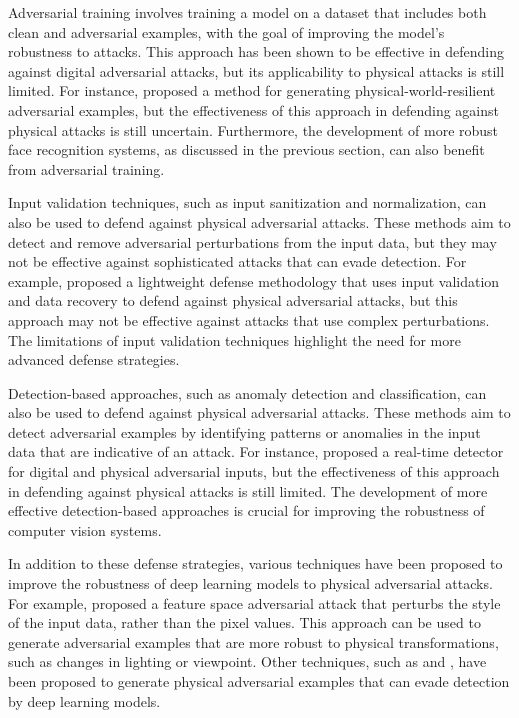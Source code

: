 \documentclass[11pt,a4paper]{article}
\begin{document}
Adversarial training involves training a model on a dataset that includes both clean and adversarial examples, with the goal of improving the model's robustness to attacks. This approach has been shown to be effective in defending against digital adversarial attacks, but its applicability to physical attacks is still limited. For instance, \cite{doi:10.1109/cvpr42600.2020.01426} proposed a method for generating physical-world-resilient adversarial examples, but the effectiveness of this approach in defending against physical attacks is still uncertain. Furthermore, the development of more robust face recognition systems, as discussed in the previous section, can also benefit from adversarial training.

Input validation techniques, such as input sanitization and normalization, can also be used to defend against physical adversarial attacks. These methods aim to detect and remove adversarial perturbations from the input data, but they may not be effective against sophisticated attacks that can evade detection. For example, \cite{doi:10.1109/asp-dac47756.2020.9045584} proposed a lightweight defense methodology that uses input validation and data recovery to defend against physical adversarial attacks, but this approach may not be effective against attacks that use complex perturbations. The limitations of input validation techniques highlight the need for more advanced defense strategies.

Detection-based approaches, such as anomaly detection and classification, can also be used to defend against physical adversarial attacks. These methods aim to detect adversarial examples by identifying patterns or anomalies in the input data that are indicative of an attack. For instance, \cite{doi:10.1145/3450267.3450535} proposed a real-time detector for digital and physical adversarial inputs, but the effectiveness of this approach in defending against physical attacks is still limited. The development of more effective detection-based approaches is crucial for improving the robustness of computer vision systems.

In addition to these defense strategies, various techniques have been proposed to improve the robustness of deep learning models to physical adversarial attacks. For example, \cite{doi:10.1609/aaai.v35i12.17259} proposed a feature space adversarial attack that perturbs the style of the input data, rather than the pixel values. This approach can be used to generate adversarial examples that are more robust to physical transformations, such as changes in lighting or viewpoint. Other techniques, such as \cite{doi:10.1109/cvpr52688.2022.01487} and \cite{doi:10.1109/vr51125.2022.00073}, have been proposed to generate physical adversarial examples that can evade detection by deep learning models.
\end{document}

